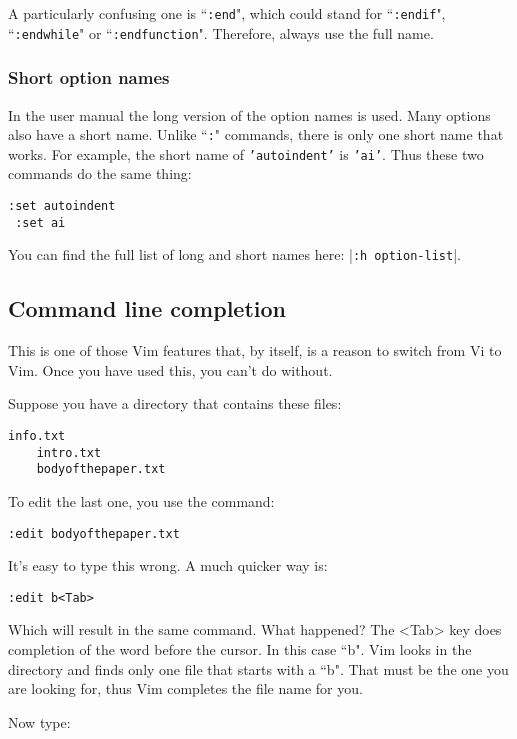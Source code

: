 A particularly confusing one is ``\texttt{:end}", which could stand for ``\texttt{:endif}", ``\texttt{:endwhile}" or ``\texttt{:endfunction}".
Therefore, always use the full name.
\subsubsection{Short option names}
In the user manual the long version of the option names is used.
Many options also have a short name.
Unlike ``\texttt{:}" commands, there is only one short name that works.
For example, the short name of \texttt{'autoindent'} is \texttt{'ai'}.
Thus these two commands do the same thing:

\begin{Verbatim}[samepage=true]
 :set autoindent
 :set ai
\end{Verbatim}

You can find the full list of long and short names here: |\texttt{:h option-list}|.
\subsection{Command line completion}
This is one of those Vim features that, by itself, is a reason to switch from Vi to Vim.
Once you have used this, you can't do without.

Suppose you have a directory that contains these files:

\begin{Verbatim}[samepage=true]
    info.txt
    intro.txt
    bodyofthepaper.txt
\end{Verbatim}

To edit the last one, you use the command:

\begin{Verbatim}[samepage=true]
 :edit bodyofthepaper.txt
\end{Verbatim}

It's easy to type this wrong.
A much quicker way is:

\begin{Verbatim}[samepage=true]
 :edit b<Tab>
\end{Verbatim}

Which will result in the same command.
What happened?
The <Tab> key does completion of the word before the cursor.
In this case ``b".
Vim looks in the directory and finds only one file that starts with a ``b".
That must be the one you are looking for, thus Vim completes the file name for you.

Now type:

